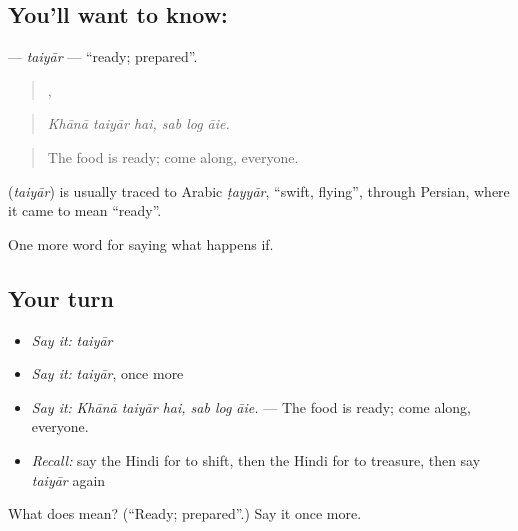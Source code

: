 \subsection*{You'll want to know: }
\textbf{} — \emph{taiyār} — \textquotedblleft{}ready; prepared\textquotedblright{}.

\begin{quote}
  ,   
\end{quote}

\begin{quote}
\emph{Khānā taiyār hai, sab log āie.}
\end{quote}

\begin{quote}
The food is ready; come along, everyone.
\end{quote}

\begin{cousinweb}
\textbf{} (\emph{taiyār}) is usually traced to Arabic \emph{ṭayyār}, \textquotedblleft{}swift, flying\textquotedblright{}, through Persian, where it came to mean \textquotedblleft{}ready\textquotedblright{}.
\end{cousinweb}

\begin{grammarlens}[title={What you've built}]
One more word for saying what happens if.
\end{grammarlens}

\subsection*{Your turn}
\begin{itemize}
\raggedright
  \item \emph{Say it:} \emph{taiyār}
  \item \emph{Say it:} \emph{taiyār}, once more
  \item \emph{Say it:} \emph{Khānā taiyār hai, sab log āie.} — The food is ready; come along, everyone.
  \item \emph{Recall:} say the Hindi for to shift, then the Hindi for to treasure, then say \emph{taiyār} again
\end{itemize}

\begin{tcolorbox}[breakable,colback=teal!4,colframe=teal!35!black,title={Before you move on}]
What does  mean? (\textquotedblleft{}Ready; prepared\textquotedblright{}.) Say it once more.
\end{tcolorbox}
